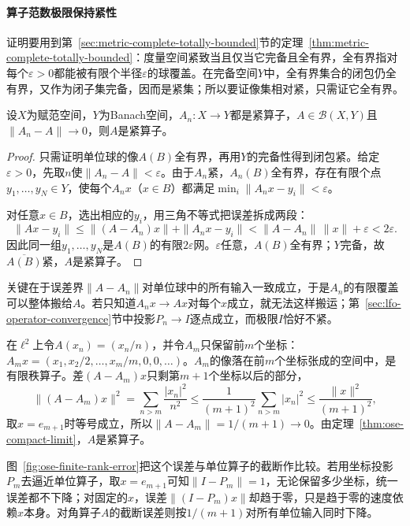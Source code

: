 \paragraph{算子范数极限保持紧性}
证明要用到第~\ref{sec:metric-complete-totally-bounded}节的定理~\ref{thm:metric-complete-totally-bounded}：度量空间紧致当且仅当它完备且全有界，全有界指对每个$\varepsilon>0$都能被有限个半径$\varepsilon$的球覆盖。在完备空间$Y$中，全有界集合的闭包仍全有界，又作为闭子集完备，因而是紧集；所以要证像集相对紧，只需证它全有界。

\begin{theorem}[紧算子集合在算子范数下闭]
\label{thm:ose-compact-limit}
设$X$为赋范空间，$Y$为Banach空间，$A_n:X\to Y$都是紧算子，$A\in\mathcal B(X,Y)$且$\|A_n-A\|\to0$，则$A$是紧算子。
\end{theorem}

\begin{proof}
只需证明单位球的像$A(B)$全有界，再用$Y$的完备性得到闭包紧。给定$\varepsilon>0$，先取$n$使$\|A_n-A\|<\varepsilon$。由于$A_n$紧，$A_n(B)$全有界，存在有限个点$y_1,\ldots,y_N\in Y$，使每个$A_nx$（$x\in B$）都满足$\min_i\|A_nx-y_i\|<\varepsilon$。

对任意$x\in B$，选出相应的$y_i$，用三角不等式把误差拆成两段：
\[
  \|Ax-y_i\|\leq\|(A-A_n)x\|+\|A_nx-y_i\|<\|A-A_n\|\,\|x\|+\varepsilon<2\varepsilon .
\]
因此同一组$y_1,\ldots,y_N$是$A(B)$的有限$2\varepsilon$网。$\varepsilon$任意，$A(B)$全有界；$Y$完备，故$\overline{A(B)}$紧，$A$是紧算子。
\end{proof}

关键在于误差界$\|A-A_n\|$对单位球中的所有输入一致成立，于是$A_n$的有限覆盖可以整体搬给$A$。若只知道$A_nx\to Ax$对每个$x$成立，就无法这样搬运；第~\ref{sec:lfo-operator-convergence}节中投影$P_n\to I$逐点成立，而极限$I$恰好不紧。

\begin{example}[对角算子的有限秩逼近]
\label{ex:ose-diagonal-finite-rank}
在$\ell^2$上令$A(x_n)=(x_n/n)$，并令$A_m$只保留前$m$个坐标：$A_mx=(x_1,x_2/2,\ldots,x_m/m,0,0,\ldots)$。$A_m$的像落在前$m$个坐标张成的空间中，是有限秩算子。差$(A-A_m)x$只剩第$m+1$个坐标以后的部分，
\[
  \|(A-A_m)x\|^2=\sum_{n>m}\frac{|x_n|^2}{n^2}\leq\frac{1}{(m+1)^2}\sum_{n>m}|x_n|^2\leq\frac{\|x\|^2}{(m+1)^2},
\]
取$x=e_{m+1}$时等号成立，所以$\|A-A_m\|=1/(m+1)\to0$。由定理~\ref{thm:ose-compact-limit}，$A$是紧算子。
\end{example}

图~\ref{fig:ose-finite-rank-error}把这个误差与单位算子的截断作比较。若用坐标投影$P_m$去逼近单位算子，取$x=e_{m+1}$可知$\|I-P_m\|=1$，无论保留多少坐标，统一误差都不下降；对固定的$x$，误差$\|(I-P_m)x\|$却趋于零，只是趋于零的速度依赖$x$本身。对角算子$A$的截断误差则按$1/(m+1)$对所有单位输入同时下降。

